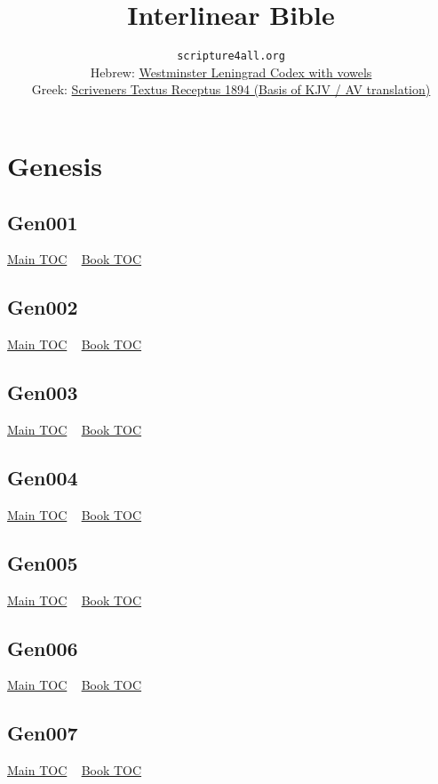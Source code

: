\documentclass{book}
\author{
  \texttt{scripture4all.org} \\
  {\footnotesize Hebrew: \href{https://www.scripture4all.org/OnlineInterlinear/Hebrew_Index.htm}{Westminster Leningrad Codex with vowels}} \\
  {\footnotesize Greek: \href{https://www.scripture4all.org/OnlineInterlinear/Greek_Index.htm}{Scriveners Textus Receptus 1894 (Basis of KJV / AV translation)}}
}
\date{}
\title{Interlinear Bible}
\begin{document}
  \maketitle

  \setcounter{tocdepth}{0}
  \dominitoc
  \begin{multicols}{3}
  \tableofcontents
  \end{multicols}

  \chapter{Genesis} \label{subsec:Gen} \begin{multicols}{2} \minitoc \end{multicols}
  \section{Gen001}\hyperlink{toc}{Main TOC} ~ \hyperref[subsec:Gen]{Book TOC} 
  \section{Gen002}\hyperlink{toc}{Main TOC} ~ \hyperref[subsec:Gen]{Book TOC} 
  \section{Gen003}\hyperlink{toc}{Main TOC} ~ \hyperref[subsec:Gen]{Book TOC} 
  \section{Gen004}\hyperlink{toc}{Main TOC} ~ \hyperref[subsec:Gen]{Book TOC} 
  \section{Gen005}\hyperlink{toc}{Main TOC} ~ \hyperref[subsec:Gen]{Book TOC} 
  \section{Gen006}\hyperlink{toc}{Main TOC} ~ \hyperref[subsec:Gen]{Book TOC} 
  \section{Gen007}\hyperlink{toc}{Main TOC} ~ \hyperref[subsec:Gen]{Book TOC} 
\end{document}
